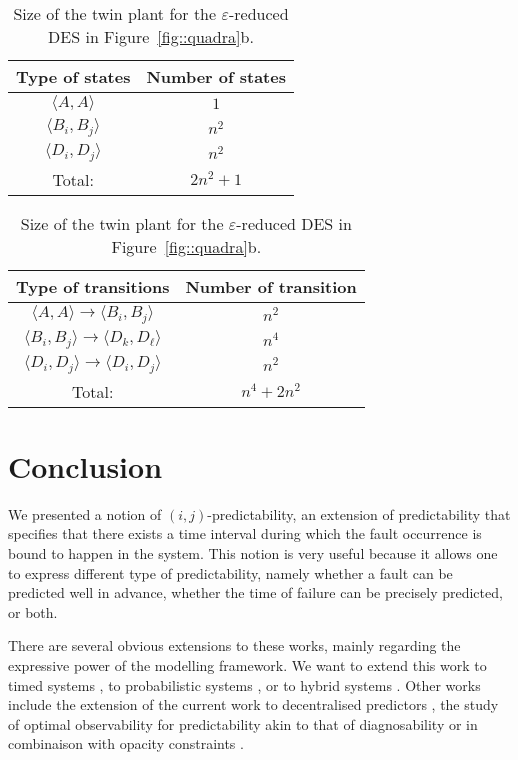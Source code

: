 \documentclass{article}
\begin{document}
\begin{table}[t!]
  \begin{minipage}{.5\linewidth}
    \begin{center}
      \begin{tabular}{c | c}
        Type of states & Number of states\\ 
        \hline 
        $\langle A, A\rangle$ & $1$\\
        $\langle B_i, B_j\rangle$ & $n^2$\\
        $\langle D_i, D_j\rangle$ & $n^2$\\
        \hline
        Total: & $2n^2 + 1$
      \end{tabular}
    \end{center}
  \end{minipage}\begin{minipage}{.5\linewidth}
    \begin{center}
      \begin{tabular}{c | c}
        Type of transitions & Number of transition\\ 
        \hline 
        $\langle A, A\rangle \rightarrow \langle B_i, B_j\rangle$ & $n^2$\\
        $\langle B_i, B_j\rangle \rightarrow \langle D_k, D_\ell\rangle$ 
        & $n^4$\\
        $\langle D_i, D_j\rangle \rightarrow \langle D_i, D_j\rangle$ 
        & $n^2$\\
        \hline
        Total: & $n^4 + 2 n^2$
      \end{tabular}
    \end{center}
  \end{minipage}
  \caption{Size of the twin plant for the $\varepsilon$-reduced 
  DES in Figure~\ref{fig::quadra}b.}
  \label{tab::tpsize2}
\end{table}

\section{Conclusion}
We presented a notion of $(i,j)$-predictability, 
an extension of predictability that specifies 
that there exists a time interval 
during which the fault occurrence is bound to happen in the system.  
This notion is very useful 
because it allows one to express different type of predictability, 
namely whether a fault can be predicted well in advance, 
whether the time of failure can be precisely predicted, 
or both.  

There are several obvious extensions to these works, 
mainly regarding the expressive power of the modelling framework.  
We want to extend this work to timed systems 
\cite{cassez-grastien::formats::13}, 
to probabilistic systems \cite{nouioua-etal::dx::14}, 
or to hybrid systems \cite{bayoudh-etal::ecai::08}.  
Other works include the extension of the current work 
to decentralised predictors \cite{takai-kumar::tac::12}, 
the study of optimal observability for predictability 
akin to that of diagnosability \cite{brandanbriones-etal::dx::08}
or in combinaison with opacity constraints
\cite{chedor-etal::jdeds::14}.  
\end{document}
